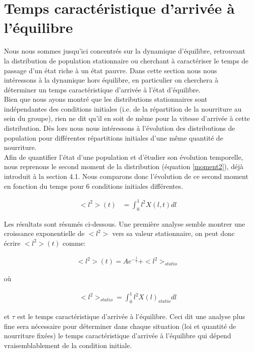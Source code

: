 \clearpage
\section{Temps caractéristique d'arrivée à l'équilibre}

Nous nous sommes jusqu'ici concentrés sur la dynamique d'équilibre, retrouvant la distribution de population stationnaire ou cherchant à caractériser le temps de passage d'un état riche à un état pauvre. Dans cette section nous nous intéressons à la dynamique hors équilibre, en particulier on cherchera à déterminer un temps caractéristique d'arrivée à l'état d'équilibre.\\

Bien que nous ayons montré que les distributions stationnaires sont indépendantes des conditions initiales (i.e. de la répartition de la nourriture au sein du groupe), rien ne dit qu'il en soit de même pour la vitesse d'arrivée à cette distribution. Dès lors nous nous intéressons à l'évolution des distributions de population pour différentes répartitions initiales d'une même quantité de nourriture.\\

Afin de quantifier l'état d'une population et d'étudier son évolution temporelle, nous reprenons le second moment de la distribution (équation \ref{moment2}), déjà introduit à la section 4.1. Nous comparons donc l'évolution de ce second moment en fonction du temps pour 6 conditions initiales différentes. 

\begin{equation}
\begin{aligned}
<l^2>(t) &= \int_0^1 l^2 X(l,t) dl 
\end{aligned}
\label{moment2}
\end{equation}


Les résultats sont résumés ci-dessous. Une première analyse semble montrer une croissance exponentielle de $<l^2>$ vers sa valeur stationnaire, on peut donc écrire $<l^2>(t)$ comme:

\begin{equation}
\begin{aligned}
<l^2>(t)=A e^{-\frac{t}{\tau}}+<l^2>_{statio}
\end{aligned}
\end{equation}

où

\begin{equation}
\begin{aligned}
<l^2>_{statio}= \int_0^1 l^2 X(l)_{statio} dl
\end{aligned}
\end{equation}

et $\tau$ est le temps caractéristique d'arrivée à l'équilibre. Ceci dit une analyse plus fine sera nécessaire pour déterminer dans chaque situation (loi et quantité de nourriture fixées) le temps caractéristique d'arrivée à l'équilibre qui dépend vraisemblablement de la condition initiale.